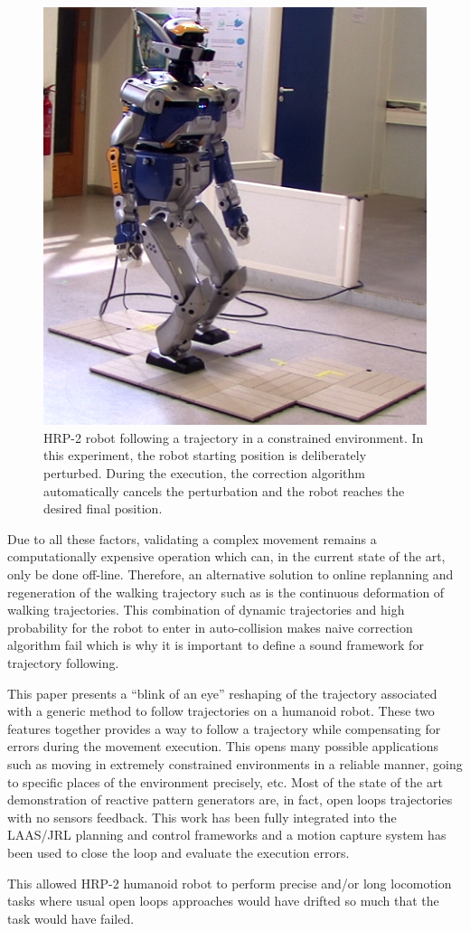 \begin{figure}[ht!]
  \begin{center}
    \includegraphics[width=.45\textwidth]{fig/exp.png}
  \end{center}
  \caption{HRP-2 robot following a trajectory in a constrained
    environment. In this experiment, the robot starting position is
    deliberately perturbed. During the execution, the correction algorithm
    automatically cancels the perturbation and the robot reaches the
    desired final position. \label{fig:following}}
\end{figure}



Due to all these factors, validating a complex movement remains a
computationally expensive operation which can, in the current state of
the art, only be done off-line. Therefore, an alternative solution to
online replanning and regeneration of the walking trajectory such as
\cite{11icra.dimitrov, 10ar.herdt, 06icra.nishiwaki, 05humanoids.michel} is
the continuous deformation of walking trajectories.  This combination
of dynamic trajectories and high probability for the robot to enter in
auto-collision makes naive correction algorithm fail which is why it
is important to define a sound framework for trajectory following.


This paper presents a ``blink of an eye'' reshaping of the trajectory
associated with a generic method to follow trajectories on a humanoid
robot. These two features together provides a way to follow a
trajectory while compensating for errors during the movement
execution. This opens many possible applications such as moving in
extremely constrained environments in a reliable manner, going to
specific places of the environment precisely, etc. Most of the state
of the art demonstration of reactive pattern generators are, in fact,
open loops trajectories with no sensors feedback. This work has been
fully integrated into the LAAS/JRL planning and control frameworks and
a motion capture system has been used to close the loop and evaluate
the execution errors.

This allowed HRP-2 humanoid robot to perform precise and/or long
locomotion tasks where usual open loops approaches would have drifted
so much that the task would have failed.

\FloatBarrier

